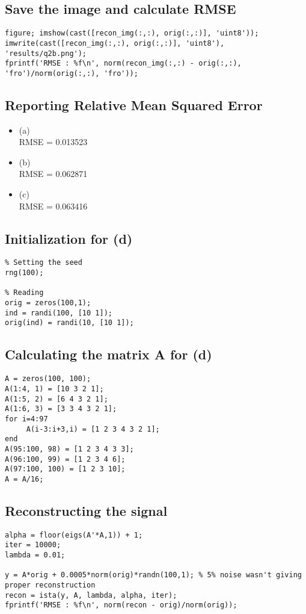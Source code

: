 \documentclass[fleqn, 11pt]{article}
\begin{document}
\subsection*{Save the image and calculate RMSE}
\begin{verbatim}
figure; imshow(cast([recon_img(:,:), orig(:,:)], 'uint8'));
imwrite(cast([recon_img(:,:), orig(:,:)], 'uint8'), 'results/q2b.png');
fprintf('RMSE : %f\n', norm(recon_img(:,:) - orig(:,:), 'fro')/norm(orig(:,:), 'fro'));
\end{verbatim}

\subsection*{Reporting Relative Mean Squared Error}
\begin{itemize}
    \item (a) \\
    RMSE = 0.013523
    \item (b) \\
    RMSE = 0.062871
    \item (c) \\
    RMSE = 0.063416
\end{itemize}

\subsection*{Initialization for (d)}
\begin{verbatim}
% Setting the seed
rng(100);

% Reading
orig = zeros(100,1);
ind = randi(100, [10 1]);
orig(ind) = randi(10, [10 1]);
\end{verbatim}

\subsection*{Calculating the matrix A for (d)}
\begin{verbatim}
A = zeros(100, 100);
A(1:4, 1) = [10 3 2 1];
A(1:5, 2) = [6 4 3 2 1];
A(1:6, 3) = [3 3 4 3 2 1];
for i=4:97
     A(i-3:i+3,i) = [1 2 3 4 3 2 1];
end
A(95:100, 98) = [1 2 3 4 3 3];
A(96:100, 99) = [1 2 3 4 6];
A(97:100, 100) = [1 2 3 10];
A = A/16;
\end{verbatim}

\subsection*{Reconstructing the signal}
\begin{verbatim}
alpha = floor(eigs(A'*A,1)) + 1;
iter = 10000;
lambda = 0.01;

y = A*orig + 0.0005*norm(orig)*randn(100,1); % 5% noise wasn't giving proper reconstruction
recon = ista(y, A, lambda, alpha, iter);
fprintf('RMSE : %f\n', norm(recon - orig)/norm(orig));
\end{verbatim}
\end{document}
